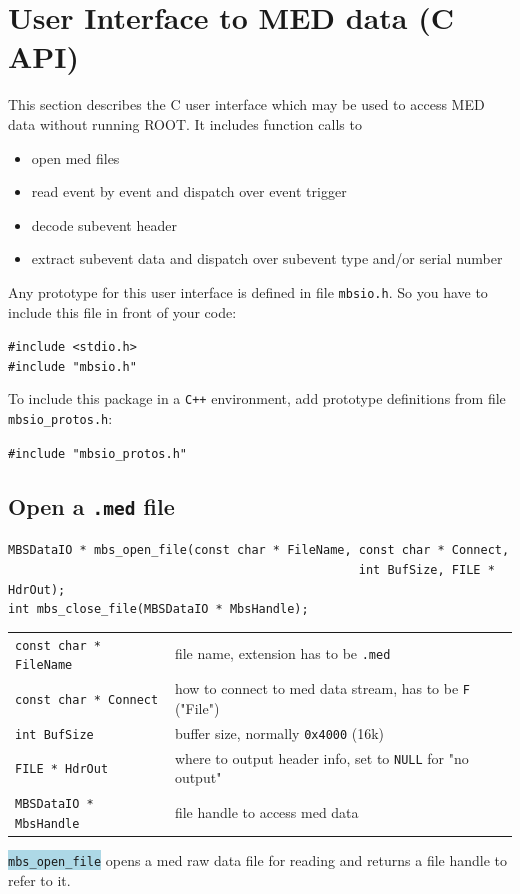 \documentclass[10pt,a4paper]{article}
\newcommand{\blue}[1]{\colorbox{lightblue}{\texttt{#1}}}
\newenvironment{blueboxed}
	{\begin{Sbox}\begin{minipage}[t]}
	{\end{minipage}\end{Sbox}\colorbox{lightblue}{\TheSbox}}
\begin{document}
\section{User Interface to MED data (C API)}
This section describes the C user interface which may be used to access MED data without running ROOT.
It includes function calls to
\begin{itemize}
	\item	open med files
	\item	read event by event and dispatch over event trigger
	\item	decode subevent header
	\item	extract subevent data and dispatch over subevent type and/or serial number
\end{itemize}
Any prototype for this user interface is defined in file \verb+mbsio.h+.
So you have to include this file in front of your code:
\begin{center}
\begin{blueboxed}{.3\linewidth}
	\verb+#include <stdio.h>+\\
	\verb+#include "mbsio.h"+
\end{blueboxed}
\end{center}
To include this package in a \texttt{C++} environment, add prototype definitions from file \verb+mbsio_protos.h+:\hfill
\begin{center}
\begin{blueboxed}{.3\linewidth}
	\verb+#include "mbsio_protos.h"+
\end{blueboxed}
\end{center}\vspace{5mm}
\subsection{Open a \texttt{.med} file}\vspace{3mm}
\begin{blueboxed}{\linewidth}
	\verb+MBSDataIO * mbs_open_file(const char * FileName, const char * Connect,+\\
	\verb+                                                 int BufSize, FILE * HdrOut);+\\
	\verb+int mbs_close_file(MBSDataIO * MbsHandle);+
\end{blueboxed}
\begin{center}
\begin{tabular}{ll}
\verb+const char * FileName+	& file name, extension has to be \verb+.med+\\
\verb+const char * Connect+	& how to connect to med data stream, has to be \verb+F+ ("File")\\
\verb+int BufSize+		& buffer size, normally \verb+0x4000+ (16k)\\
\verb+FILE * HdrOut+		& where to output header info, set to \verb+NULL+ for "no output"\\
\verb+MBSDataIO * MbsHandle+	& file handle to access med data\\
\end{tabular}
\end{center}
\blue{mbs\_open\_file} opens a med raw data file for reading and returns a file handle to refer to it.
\end{document}
